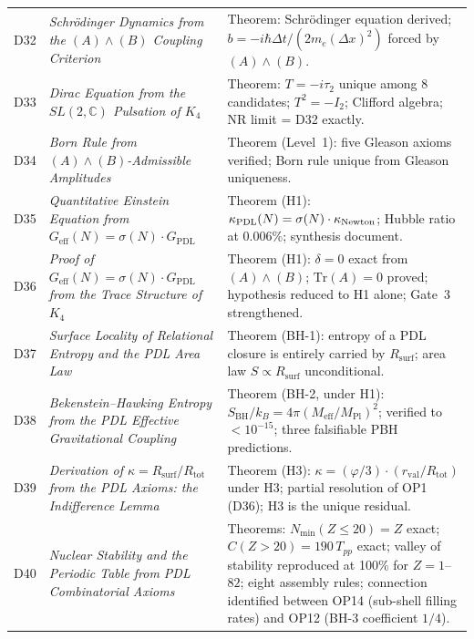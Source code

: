 \documentclass[11pt,a4paper]{article}
\theoremstyle{plain}
\theoremstyle{definition}
\theoremstyle{remark}
\newcommand{\PDL}{\textnormal{PDL}}
\newcommand{\Kfour}{K_4}
\newcommand{\Geff}{G_{\mathrm{eff}}}
\newcommand{\GPDL}{G_{\mathrm{PDL}}}
\newcommand{\rval}{r_{\mathrm{val}}}
\newcommand{\Rsurf}{R_{\mathrm{surf}}}
\newcommand{\Rtot}{R_{\mathrm{tot}}}
\newcommand{\sigmaN}{\sigma(N)}
\newcommand{\SBH}{S_{\mathrm{BH}}}
\newcommand{\Meff}{M_{\mathrm{eff}}}
\newcommand{\MPl}{M_{\mathrm{Pl}}}
\newcommand{\Tpp}{T_{pp}}
\newcommand{\Nmin}{N_{\min}}
\begin{document}
\begin{longtable}{@{}L{1.3cm}L{3.8cm}L{8.0cm}@{}}
D32 & \textit{Schr\"odinger Dynamics from the $(A)\wedge(B)$ Coupling Criterion}~\citep{D32} & \textcolor{proofblue}{Theorem}: Schr\"odinger equation derived; $b=-i\hbar\Delta t/(2m_e(\Delta x)^2)$ forced by $(A)\wedge(B)$. \\[0.3em]

D33 & \textit{Dirac Equation from the $SL(2,\mathbb{C})$ Pulsation of $\Kfour$}~\citep{D33} & \textcolor{proofblue}{Theorem}: $T=-i\tau_2$ unique among 8 candidates; $T^2=-I_2$; Clifford algebra; NR limit = D32 exactly. \\[0.3em]

D34 & \textit{Born Rule from $(A)\wedge(B)$-Admissible Amplitudes}~\citep{D34} & \textcolor{proofblue}{Theorem (Level~1)}: five Gleason axioms verified; Born rule unique from Gleason uniqueness. \\[0.3em]

D35 & \textit{Quantitative Einstein Equation from $\Geff(N)=\sigmaN\cdot\GPDL$}~\citep{D35} & \textcolor{proofblue}{Theorem (H1)}: $\kappa_{\PDL}(N)=\sigmaN\cdot\kappa_{\mathrm{Newton}}$; Hubble ratio at 0.006\%; synthesis document. \\[0.3em]

D36 & \textit{Proof of $\Geff(N)=\sigmaN\cdot\GPDL$ from the Trace Structure of $\Kfour$}~\citep{D36} & \textcolor{proofblue}{Theorem (H1)}: $\delta=0$ exact from $(A)\wedge(B)$; $\mathrm{Tr}(A)=0$ proved; hypothesis reduced to H1 alone; Gate~3 strengthened. \\[0.4em]

D37 & \textit{Surface Locality of Relational Entropy and the PDL Area Law}~\citep{D37} & \textcolor{proofblue}{Theorem (BH-1)}: entropy of a PDL closure is entirely carried by $\Rsurf$; area law $S\propto\Rsurf$ unconditional. \\[0.3em]

D38 & \textit{Bekenstein--Hawking Entropy from the PDL Effective Gravitational Coupling}~\citep{D38} & \textcolor{proofblue}{Theorem (BH-2, under H1)}: $\SBH/k_B=4\pi(\Meff/\MPl)^2$; verified to $<10^{-15}$; three falsifiable PBH predictions. \\[0.3em]

D39 & \textit{Derivation of $\kappa=\Rsurf/\Rtot$ from the PDL Axioms: the Indifference Lemma}~\citep{D39} & \textcolor{proofblue}{Theorem (H3)}: $\kappa=(\varphi/3)\cdot(\rval/\Rtot)$ under H3; partial resolution of OP1 (D36); H3 is the unique residual. \\[0.4em]

D40 & \textit{Nuclear Stability and the Periodic Table from PDL Combinatorial Axioms}~\citep{D40} & \textcolor{proofblue}{Theorems}: $\Nmin(Z\leq20)=Z$ exact; $C(Z>20)=190\,\Tpp$ exact; valley of stability reproduced at 100\% for $Z=1$--$82$; eight assembly rules; connection identified between OP14 (sub-shell filling rates) and OP12 (BH-3 coefficient $1/4$). \\[0.4em]


\end{longtable}
\end{document}
